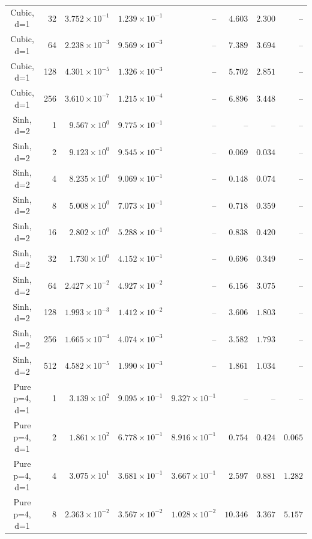 \begin{longtable}{@{}crrrrrrr@{}}
Cubic, d=1 & 32 & $3.752\!\times\!10^{-1}$ & $1.239\!\times\!10^{-1}$ & -- & $4.603$ & $2.300$ & -- \\
Cubic, d=1 & 64 & $2.238\!\times\!10^{-3}$ & $9.569\!\times\!10^{-3}$ & -- & $7.389$ & $3.694$ & -- \\
Cubic, d=1 & 128 & $4.301\!\times\!10^{-5}$ & $1.326\!\times\!10^{-3}$ & -- & $5.702$ & $2.851$ & -- \\
Cubic, d=1 & 256 & $3.610\!\times\!10^{-7}$ & $1.215\!\times\!10^{-4}$ & -- & $6.896$ & $3.448$ & -- \\
Sinh, d=2 & 1 & $9.567\!\times\!10^{0}$ & $9.775\!\times\!10^{-1}$ & -- & -- & -- & -- \\
Sinh, d=2 & 2 & $9.123\!\times\!10^{0}$ & $9.545\!\times\!10^{-1}$ & -- & $0.069$ & $0.034$ & -- \\
Sinh, d=2 & 4 & $8.235\!\times\!10^{0}$ & $9.069\!\times\!10^{-1}$ & -- & $0.148$ & $0.074$ & -- \\
Sinh, d=2 & 8 & $5.008\!\times\!10^{0}$ & $7.073\!\times\!10^{-1}$ & -- & $0.718$ & $0.359$ & -- \\
Sinh, d=2 & 16 & $2.802\!\times\!10^{0}$ & $5.288\!\times\!10^{-1}$ & -- & $0.838$ & $0.420$ & -- \\
Sinh, d=2 & 32 & $1.730\!\times\!10^{0}$ & $4.152\!\times\!10^{-1}$ & -- & $0.696$ & $0.349$ & -- \\
Sinh, d=2 & 64 & $2.427\!\times\!10^{-2}$ & $4.927\!\times\!10^{-2}$ & -- & $6.156$ & $3.075$ & -- \\
Sinh, d=2 & 128 & $1.993\!\times\!10^{-3}$ & $1.412\!\times\!10^{-2}$ & -- & $3.606$ & $1.803$ & -- \\
Sinh, d=2 & 256 & $1.665\!\times\!10^{-4}$ & $4.074\!\times\!10^{-3}$ & -- & $3.582$ & $1.793$ & -- \\
Sinh, d=2 & 512 & $4.582\!\times\!10^{-5}$ & $1.990\!\times\!10^{-3}$ & -- & $1.861$ & $1.034$ & -- \\
Pure p=4, d=1 & 1 & $3.139\!\times\!10^{2}$ & $9.095\!\times\!10^{-1}$ & $9.327\!\times\!10^{-1}$ & -- & -- & -- \\
Pure p=4, d=1 & 2 & $1.861\!\times\!10^{2}$ & $6.778\!\times\!10^{-1}$ & $8.916\!\times\!10^{-1}$ & $0.754$ & $0.424$ & $0.065$ \\
Pure p=4, d=1 & 4 & $3.075\!\times\!10^{1}$ & $3.681\!\times\!10^{-1}$ & $3.667\!\times\!10^{-1}$ & $2.597$ & $0.881$ & $1.282$ \\
Pure p=4, d=1 & 8 & $2.363\!\times\!10^{-2}$ & $3.567\!\times\!10^{-2}$ & $1.028\!\times\!10^{-2}$ & $10.346$ & $3.367$ & $5.157$ \\

\end{longtable}
